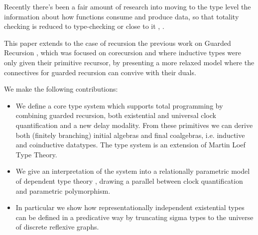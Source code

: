 \documentclass{sigplanconf}
\begin{document}
Recently there's been a fair amount of research into moving to the
type level the information about how functions consume and produce
data, so that totality checking is reduced to type-checking
\cite{BobConor} \cite{Rasmus} or close to it \cite{Andreas}, \cite{Foundational Coinduction}.

This paper extends to the case of recursion
the previous work on Guarded Recursion \cite{BobConor} \cite{Rasmus},
which was focused on corecursion and where inductive types were only
given their primitive recursor, by presenting a more relaxed model where
the connectives for guarded recursion can convive with their duals.

We make the following contributions:
\begin{itemize}
\item We define a core type system which supports total programming by
  combining guarded recursion, both existential and universal clock
  quantification and a new delay modality. From these primitives we
  can derive both (finitely branching) initial algebras and final
  coalgebras, i.e. inductive and coinductive datatypes. The type
  system is an extension of Martin Loef Type Theory.
\item We give an interpretation of the system into a relationally
  parametric model of dependent type theory \cite{atkey:param-model},
  drawing a parallel between clock quantification and parametric
  polymorphism.
\item In particular we show how representationally independent
  existential types can be defined in a predicative way by truncating
  sigma types to the universe of discrete reflexive graphs.
\end{itemize}


      
\end{document}
